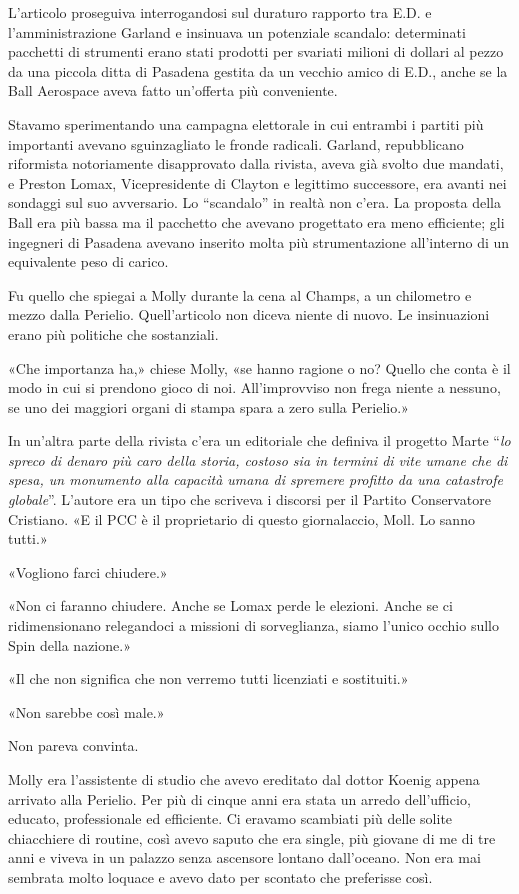 L'articolo proseguiva interrogandosi sul duraturo rapporto tra E.D. e
l'amministrazione Garland e insinuava un potenziale scandalo:
determinati pacchetti di strumenti erano stati prodotti per svariati
milioni di dollari al pezzo da una piccola ditta di Pasadena gestita da
un vecchio amico di E.D., anche se la Ball Aerospace aveva fatto
un'offerta più conveniente.

Stavamo sperimentando una campagna elettorale in cui entrambi i partiti
più importanti avevano sguinzagliato le fronde radicali. Garland,
repubblicano riformista notoriamente disapprovato dalla rivista, aveva
già svolto due mandati, e Preston Lomax, Vicepresidente di Clayton e
legittimo successore, era avanti nei sondaggi sul suo avversario. Lo
``scandalo'' in realtà non c'era. La proposta della Ball era più bassa
ma il pacchetto che avevano progettato era meno efficiente; gli
ingegneri di Pasadena avevano inserito molta più strumentazione
all'interno di un equivalente peso di carico.

Fu quello che spiegai a Molly durante la cena al Champs, a un chilometro
e mezzo dalla Perielio. Quell'articolo non diceva niente di nuovo. Le
insinuazioni erano più politiche che sostanziali.

«Che importanza ha,» chiese Molly, «se hanno ragione o no? Quello che
conta è il modo in cui si prendono gioco di noi. All'improvviso non
frega niente a nessuno, se uno dei maggiori organi di stampa spara a
zero sulla Perielio.»

In un'altra parte della rivista c'era un editoriale che definiva il
progetto Marte ``\emph{lo spreco di denaro più caro della storia,
	costoso sia in termini di vite umane che di spesa, un monumento alla
	capacità umana di spremere profitto da una catastrofe globale}''.
L'autore era un tipo che scriveva i discorsi per il Partito Conservatore
Cristiano. «E il PCC è il proprietario di questo giornalaccio, Moll. Lo
sanno tutti.»

«Vogliono farci chiudere.»

«Non ci faranno chiudere. Anche se Lomax perde le elezioni. Anche se ci
ridimensionano relegandoci a missioni di sorveglianza, siamo l'unico
occhio sullo Spin della nazione.»

«Il che non significa che non verremo tutti licenziati e sostituiti.»

«Non sarebbe così male.»

Non pareva convinta.

Molly era l'assistente di studio che avevo ereditato dal dottor Koenig
appena arrivato alla Perielio. Per più di cinque anni era stata un
arredo dell'ufficio, educato, professionale ed efficiente. Ci eravamo
scambiati più delle solite chiacchiere di routine, così avevo saputo che
era single, più giovane di me di tre anni e viveva in un palazzo senza
ascensore lontano dall'oceano. Non era mai sembrata molto loquace e
avevo dato per scontato che preferisse così.

